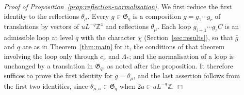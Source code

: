 \documentclass[11pt]{preprint}
\numberwithin{equation}{section}
\theoremstyle{definition}
\theoremstyle{remark}
\theoremstyle{plain}
\begin{document}
\begin{proof}[Proof of Proposition~\ref{prop:reflection-normalisation}]
We first reduce the first identity to the reflections $\theta_\mu$. Every $g \in \mathfrak G_q$ is a composition $g = g_1 \cdots g_r$ of translations by vectors of $uL^{-q}\mathbb Z^4$ and reflections $\theta_\mu$. Each loop $g_{i+1} \cdots g_rC$ is an admissible loop at level $q$ with the character $\chi$ (Section~\ref{sec:results}), so that $\bar g$ and $q$ are as in Theorem~\ref{thm:main} for it, the conditions of that theorem involving the loop only through $c_\pi$ and $\Lambda_*$; and the normalisation of a loop is unchanged by a translation in $\mathfrak G_q$, as noted after the proposition. It therefore suffices to prove the first identity for $g = \theta_\mu$, and the last assertion follows from the first two identities, since $\theta_{\mu,a} \in \mathfrak G_q$ when $2a \in uL^{-q}\mathbb Z$.


\end{proof}
\end{document}
